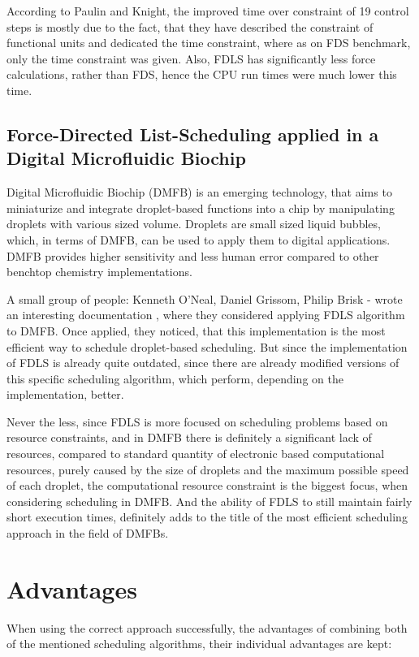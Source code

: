 \documentclass[conference]{IEEEtran}
\begin{document}
According to Paulin and Knight, the improved time over constraint of 19 control steps is mostly due to the fact, that they have described the constraint of functional units and dedicated the time constraint, where as on FDS benchmark, only the time constraint was given. Also, FDLS has significantly less force calculations, rather than FDS, hence the CPU run times were much lower this time.

\subsection{Force-Directed List-Scheduling applied in a Digital Microfluidic Biochip}

Digital Microfluidic Biochip (DMFB) is an emerging technology, that aims to miniaturize and integrate droplet-based functions into a chip by manipulating droplets with various sized volume. Droplets are small sized liquid bubbles, which, in terms of DMFB, can be used to apply them to digital applications. DMFB provides higher sensitivity and less human error compared to other benchtop chemistry implementations.

A small group of people: Kenneth O'Neal, Daniel Grissom, Philip Brisk - wrote an interesting documentation \cite{b5}, where they considered applying FDLS algorithm to DMFB. Once applied, they noticed, that this implementation is the most efficient way to schedule droplet-based scheduling. But since the implementation of FDLS is already quite outdated, since there are already modified versions of this specific scheduling algorithm, which perform, depending on the implementation, better.

Never the less, since FDLS is more focused on scheduling problems based on resource constraints, and in DMFB there is definitely a significant lack of resources, compared to standard quantity of electronic based computational resources, purely caused by the size of droplets and the maximum possible speed of each droplet, the computational resource constraint is the biggest focus, when considering scheduling in DMFB. And the ability of FDLS to still maintain fairly short execution times, definitely adds to the title of the most efficient scheduling approach in the field of DMFBs.



\section{Advantages}
When using the correct approach successfully, the advantages of combining both of the mentioned scheduling algorithms, their individual advantages are kept:
\end{document}
